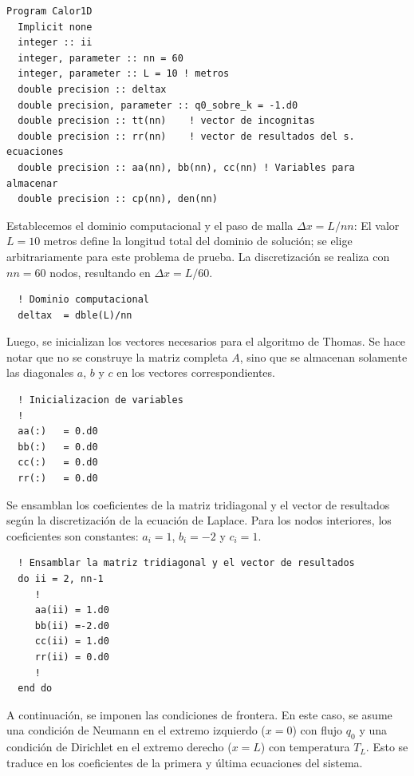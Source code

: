 \documentclass[11pt,a4paper]{article}
\begin{document}
\begin{verbatim}
Program Calor1D
  Implicit none
  integer :: ii
  integer, parameter :: nn = 60
  integer, parameter :: L = 10 ! metros
  double precision :: deltax
  double precision, parameter :: q0_sobre_k = -1.d0
  double precision :: tt(nn)    ! vector de incognitas
  double precision :: rr(nn)    ! vector de resultados del s. ecuaciones
  double precision :: aa(nn), bb(nn), cc(nn) ! Variables para almacenar
  double precision :: cp(nn), den(nn)
\end{verbatim}

Establecemos el dominio computacional y el paso de malla $\Delta x = L/nn$:
El valor $L=10$ metros define la longitud total del dominio de soluci\'on; se elige
arbitrariamente para este problema de prueba. La discretizaci\'on se realiza 
con $nn=60$ nodos, resultando en $\Delta x = L/60$.

\begin{verbatim}
  ! Dominio computacional
  deltax  = dble(L)/nn
\end{verbatim}

Luego, se inicializan los vectores necesarios para el algoritmo de Thomas.
Se hace notar que no se construye la matriz completa $A$, sino que se almacenan 
solamente las diagonales $a$, $b$ y $c$ en los vectores correspondientes.

\begin{verbatim}
  ! Inicializacion de variables
  !
  aa(:)   = 0.d0
  bb(:)   = 0.d0
  cc(:)   = 0.d0
  rr(:)   = 0.d0
\end{verbatim}

Se ensamblan los coeficientes de la matriz tridiagonal y el vector de resultados
seg\'un la discretizaci\'on de la ecuaci\'on de Laplace. Para los nodos 
interiores, los coeficientes son constantes: $a_i=1$, $b_i=-2$ y $c_i=1$.

\begin{verbatim}
  ! Ensamblar la matriz tridiagonal y el vector de resultados
  do ii = 2, nn-1
     !
     aa(ii) = 1.d0
     bb(ii) =-2.d0
     cc(ii) = 1.d0
     rr(ii) = 0.d0
     !
  end do
\end{verbatim}

A continuaci\'on, se imponen las condiciones de frontera. En este caso, 
se asume una condici\'on de Neumann en el extremo izquierdo ($x=0$) con 
flujo $q_0$ y una condici\'on de Dirichlet en el extremo derecho ($x=L$) 
con temperatura $T_L$. Esto se traduce en los coeficientes de la primera y 
\'ultima ecuaciones del sistema.
\end{document}
